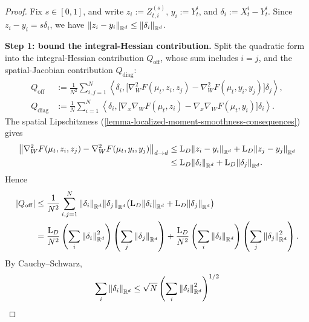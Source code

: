 \begin{proof}
Fix \(s\in[0,1]\), and write \(z_i:=Z_{t,i}^{(s)}\), \(y_i:=Y_t^i\), and
\(\delta_i:=X_t^i-Y_t^i\). Since \(z_i-y_i=s\delta_i\), we have
\(\norm{z_i-y_i}_{\mathbb R^d}\le \norm{\delta_i}_{\mathbb R^d}\).

\par\noindent\textbf{Step 1: bound the integral-Hessian contribution.}
Split the quadratic form into the integral-Hessian contribution
$Q_{\mathrm{off}}$, whose sum includes $i=j$, and the spatial-Jacobian
contribution $Q_{\mathrm{diag}}$:
\begin{align}
    Q_{\mathrm{off}}
    &:=
    \frac1{N^2}\sum_{i,j=1}^N
    \left\langle
        \delta_i,
        \bigl[
            \nabla_W^2F(\mu_t,z_i,z_j)-
            \nabla_W^2F(\mu_t,y_i,y_j)
        \bigr]
        \delta_j
    \right\rangle,\\
    Q_{\mathrm{diag}}
    &:=
    \frac1N\sum_{i=1}^N
    \left\langle
        \delta_i,
        \bigl[
            \nabla_x\nabla_WF(\mu_t,z_i)-
            \nabla_x\nabla_WF(\mu_t,y_i)
        \bigr]
        \delta_i
    \right\rangle.
\end{align}
The spatial Lipschitzness (\cref{lemma-localized-moment-smoothness-consequences}) gives
\begin{equation}
 \begin{aligned}
    \norm{
        \nabla_W^2F(\mu_t,z_i,z_j)-
        \nabla_W^2F(\mu_t,y_i,y_j)
    }_{{d}\to{d}}
    &\le \mathrm L_D\norm{z_i-y_i}_{\mathbb R^d}+\mathrm L_D\norm{z_j-y_j}_{\mathbb R^d}\\
    &\le \mathrm L_D\norm{\delta_i}_{\mathbb R^d}+\mathrm L_D\norm{\delta_j}_{\mathbb R^d}.
 \end{aligned}
\end{equation}
Hence
\begin{align}
    |Q_{\mathrm{off}}|
    &\le
    \frac1{N^2}\sum_{i,j=1}^N
    \norm{\delta_i}_{\mathbb R^d}\norm{\delta_j}_{\mathbb R^d}
    \bigl(\mathrm L_D\norm{\delta_i}_{\mathbb R^d}+\mathrm L_D\norm{\delta_j}_{\mathbb R^d}\bigr)\\
    &=
    \frac{\mathrm L_D}{N^2}
    \left(\sum_i\norm{\delta_i}_{\mathbb R^d}^2\right)
    \left(\sum_j\norm{\delta_j}_{\mathbb R^d}\right)
    +
    \frac{\mathrm L_D}{N^2}
    \left(\sum_i\norm{\delta_i}_{\mathbb R^d}\right)
    \left(\sum_j\norm{\delta_j}_{\mathbb R^d}^2\right).
\end{align}
By Cauchy--Schwarz,
\[
    \sum_i\norm{\delta_i}_{\mathbb R^d}
    \le
    \sqrt N\left(\sum_i\norm{\delta_i}_{\mathbb R^d}^2\right)^{1/2}
\]
\end{proof}
